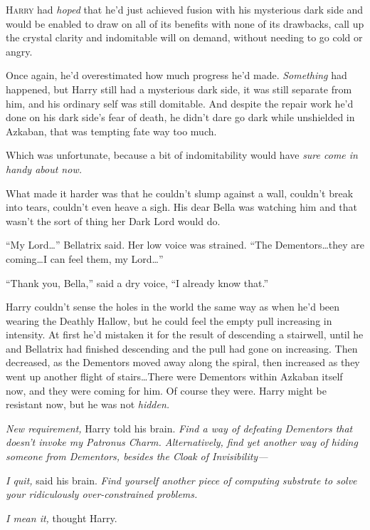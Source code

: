 
\lettrine{H}{arry} had \emph{hoped} that he’d just achieved fusion with his mysterious dark side and would be enabled to draw on all of its benefits with none of its drawbacks, call up the crystal clarity and indomitable will on demand, without needing to go cold or angry.

Once again, he’d overestimated how much progress he’d made. \emph{Something} had happened, but Harry still had a mysterious dark side, it was still separate from him, and his ordinary self was still domitable. And despite the repair work he’d done on his dark side’s fear of death, he didn’t dare go dark while unshielded in Azkaban, that was tempting fate way too much.

Which was unfortunate, because a bit of indomitability would have \emph{sure come in handy about now.}

What made it harder was that he couldn’t slump against a wall, couldn’t break into tears, couldn’t even heave a sigh. His dear Bella was watching him and that wasn’t the sort of thing her Dark Lord would do.

“My Lord…” Bellatrix said. Her low voice was strained. “The Dementors…they are coming…I can feel them, my Lord…”

“Thank you, Bella,” said a dry voice, “I already know that.”

Harry couldn’t sense the holes in the world the same way as when he’d been wearing the Deathly Hallow, but he could feel the empty pull increasing in intensity. At first he’d mistaken it for the result of descending a stairwell, until he and Bellatrix had finished descending and the pull had gone on increasing. Then decreased, as the Dementors moved away along the spiral, then increased as they went up another flight of stairs…There were Dementors within Azkaban itself now, and they were coming for him. Of course they were. Harry might be resistant now, but he was not \emph{hidden.}

\emph{New requirement,} Harry told his brain. \emph{Find a way of defeating Dementors that doesn’t invoke my Patronus Charm. Alternatively, find yet another way of hiding someone from Dementors, besides the Cloak of Invisibility—}

\emph{I quit,} said his brain. \emph{Find yourself another piece of computing substrate to solve your ridiculously over-constrained problems.}

\emph{I mean it,} thought Harry.

